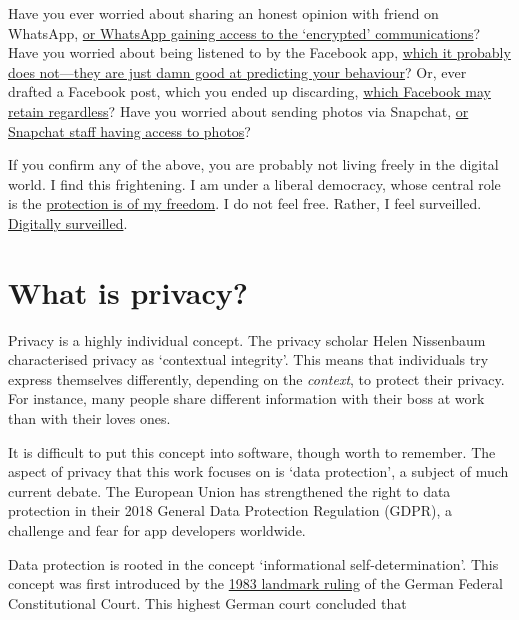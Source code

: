 \documentclass[
]{book}
\begin{document}
Have you ever worried about sharing an honest opinion with friend on WhatsApp, \href{https://www.wired.com/story/whatsapp-security-flaws-encryption-group-chats/}{or WhatsApp gaining access to the `encrypted' communications}? Have you worried about being listened to by the Facebook app, \href{https://www.newstatesman.com/science-tech/social-media/2018/03/testing-facebook-listens-your-conversations-adverts}{which it probably does not---they are just damn good at predicting your behaviour}? Or, ever drafted a Facebook post, which you ended up discarding, \href{https://slate.com/technology/2013/12/facebook-self-censorship-what-happens-to-the-posts-you-dont-publish.html}{which Facebook may retain regardless}? Have you worried about sending photos via Snapchat, \href{https://www.vice.com/en_us/article/xwnva7/snapchat-employees-abused-data-access-spy-on-users-snaplion}{or Snapchat staff having access to photos}?

If you confirm any of the above, you are probably not living freely in the digital world. I find this frightening. I am under a liberal democracy, whose central role is the \href{https://oll.libertyfund.org/quotes/497}{protection is of my freedom}. I do not feel free. Rather, I feel surveilled. \href{https://www.theguardian.com/books/2019/feb/02/age-of-surveillance-capitalism-shoshana-zuboff-review}{Digitally surveilled}.

\hypertarget{what-is-privacy}{%
\section{What is privacy?}\label{what-is-privacy}}

Privacy is a highly individual concept. The privacy scholar Helen Nissenbaum characterised privacy as `contextual integrity'. This means that individuals try express themselves differently, depending on the \emph{context}, to protect their privacy. For instance, many people share different information with their boss at work than with their loves ones.

It is difficult to put this concept into software, though worth to remember. The aspect of privacy that this work focuses on is `data protection', a subject of much current debate. The European Union has strengthened the right to data protection in their 2018 General Data Protection Regulation (GDPR), a challenge and fear for app developers worldwide.

Data protection is rooted in the concept `informational self-determination'. This concept was first introduced by the \href{https://www.bundesverfassungsgericht.de/SharedDocs/Entscheidungen/EN/1983/12/rs19831215_1bvr020983en.html}{1983 landmark ruling} of the German Federal Constitutional Court. This highest German court concluded that
\end{document}
